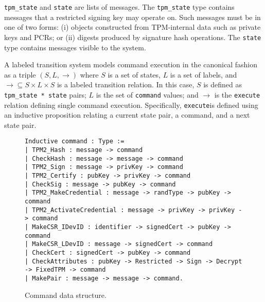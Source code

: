 \documentclass[runningheads]{llncs}
\begin{document}
\verb|tpm_state| and \verb|state| are lists of messages. The
\verb|tpm_state| type contains messages that a restricted signing key
may operate on. Such messages must be in one of two forms: (i) objects
constructed from TPM-internal data such as private keys and PCRs; or
(ii) digests produced by signature hash operations.  The \verb|state|
type contains messages visible to the system.

A labeled transition system models command execution in the canonical
fashion as a triple $(S,L,\rightarrow)$ where $S$ is a set of states,
$L$ is a set of labels, and
$\rightarrow \subseteq S \times L \times S$ is a labeled transition
relation.  In this case, $S$ is defined as \verb|tpm_state * state|
pairs; $L$ is the set of \verb|command| values; and $\rightarrow$ is
the \verb|execute| relation defining single command execution.
Specifically, \verb|execute|is defined using an inductive proposition
relating a current state pair, a command, and a next state pair.



\begin{figure}[hbtp]
  \begin{footnotesize}
\begin{lstlisting}[language=Coq]
Inductive command : Type :=
| TPM2_Hash : message -> command
| CheckHash : message -> message -> command
| TPM2_Sign : message -> privKey -> command
| TPM2_Certify : pubKey -> privKey -> command
| CheckSig : message -> pubKey -> command
| TPM2_MakeCredential : message -> randType -> pubKey -> command
| TPM2_ActivateCredential : message -> privKey -> privKey -> command
| MakeCSR_IDevID : identifier -> signedCert -> pubKey -> command
| MakeCSR_LDevID : message -> signedCert -> command
| CheckCert : signedCert -> pubKey -> command
| CheckAttributes : pubKey -> Restricted -> Sign -> Decrypt -> FixedTPM -> command
| MakePair : message -> message -> command.
\end{lstlisting}
\end{footnotesize}
\caption{Command data structure.}
\label{fig:command-model}
\end{figure}
\end{document}
